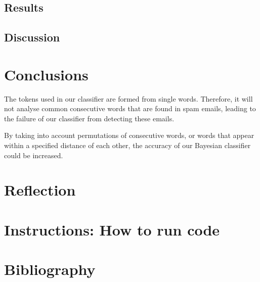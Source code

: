 \documentclass[10pt, a4paper]{article}
\begin{document}
\subsection{Results}

\subsection{Discussion}

\section{Conclusions}

The tokens used in our classifier are formed from single words. Therefore, it will not analyse common consecutive words that are found in spam emails, leading to the failure of our classifier from detecting these emails.

By taking into account permutations of consecutive words, or words that appear within a specified distance of each other, the accuracy of our Bayesian classifier could be increased.

\section{Reflection}

\section{Instructions: How to run code}

\section{Bibliography}
\end{document}
